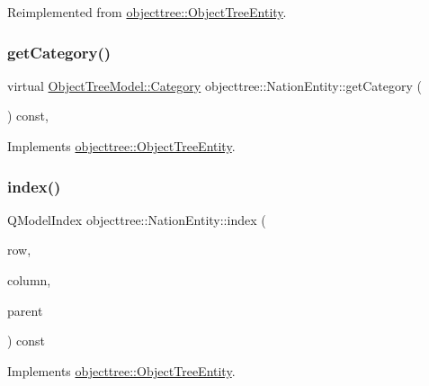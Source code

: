 Reimplemented from \mbox{\hyperlink{classobjecttree_1_1_object_tree_entity_a71042bfb5a8328bcbde9d283c0b1b28c}{objecttree\+::\+Object\+Tree\+Entity}}.

\mbox{\label{classobjecttree_1_1_nation_entity_aade68d7d80fda8f3bff7e01236299c4c}} 
\subsubsection{\texorpdfstring{getCategory()}{getCategory()}}
{\footnotesize\ttfamily virtual \mbox{\hyperlink{class_object_tree_model_a379e9d6b0d381853785adf62095ba4e3}{Object\+Tree\+Model\+::\+Category}} objecttree\+::\+Nation\+Entity\+::get\+Category (\begin{DoxyParamCaption}{ }\end{DoxyParamCaption}) const\hspace{0.3cm}{\ttfamily [inline]}, {\ttfamily [virtual]}}



Implements \mbox{\hyperlink{classobjecttree_1_1_object_tree_entity_aa4e80e7fa80672c1b9902add665abc77}{objecttree\+::\+Object\+Tree\+Entity}}.

\mbox{\label{classobjecttree_1_1_nation_entity_a29d4f8e8200a1573413da0695313bdc2}} 
\subsubsection{\texorpdfstring{index()}{index()}}
{\footnotesize\ttfamily Q\+Model\+Index objecttree\+::\+Nation\+Entity\+::index (\begin{DoxyParamCaption}\item[{int}]{row,  }\item[{int}]{column,  }\item[{const Q\+Model\+Index \&}]{parent }\end{DoxyParamCaption}) const\hspace{0.3cm}{\ttfamily [virtual]}}



Implements \mbox{\hyperlink{classobjecttree_1_1_object_tree_entity_a9ccaab3b27e65b1ed8b22f00c57a1082}{objecttree\+::\+Object\+Tree\+Entity}}.

